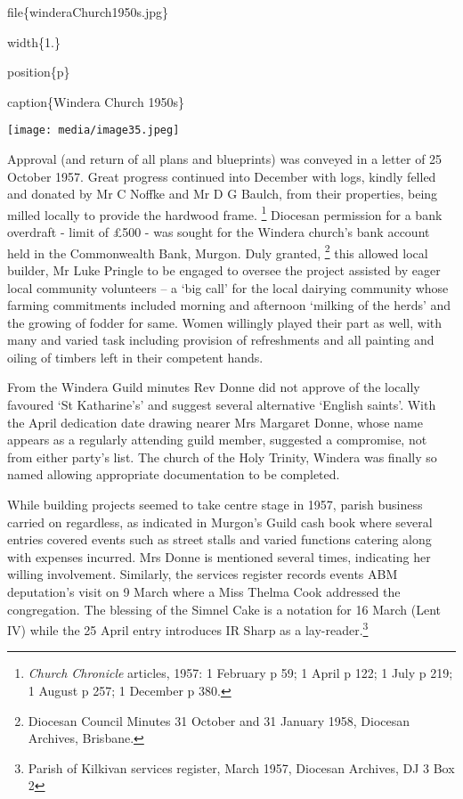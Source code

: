 file\{winderaChurch1950s.jpg\}

width\{1.\}

position\{p\}

caption\{Windera Church 1950s\}

\texttt{[image: media/image35.jpeg]}

Approval (and return of all plans and blueprints) was conveyed in a letter of 25 October 1957. Great progress continued into December with logs, kindly felled and donated by Mr C Noffke and Mr D G Baulch, from their properties, being milled locally to provide the hardwood frame. \footnote{\emph{Church Chronicle} articles, 1957: 1 February p 59; 1 April p 122; 1 July p 219; 1 August p 257; 1 December p 380.} Diocesan permission for a bank overdraft - limit of £500 - was sought for the Windera church's bank account held in the Commonwealth Bank, Murgon. Duly granted, \footnote{Diocesan Council Minutes 31 October and 31 January 1958, Diocesan Archives, Brisbane.} this allowed local builder, Mr Luke Pringle to be engaged to oversee the project assisted by eager local community volunteers -- a `big call' for the local dairying community whose farming commitments included morning and afternoon `milking of the herds' and the growing of fodder for same. Women willingly played their part as well, with many and varied task including provision of refreshments and all painting and oiling of timbers left in their competent hands.

From the Windera Guild minutes Rev Donne did not approve of the locally favoured `St Katharine's' and suggest several alternative `English saints'. With the April dedication date drawing nearer Mrs Margaret Donne, whose name appears as a regularly attending guild member, suggested a compromise, not from either party's list. The church of the Holy Trinity, Windera was finally so named allowing appropriate documentation to be completed.

While building projects seemed to take centre stage in 1957, parish business carried on regardless, as indicated in Murgon's Guild cash book where several entries covered events such as street stalls and varied functions catering along with expenses incurred. Mrs Donne is mentioned several times, indicating her willing involvement. Similarly, the services register records events ABM deputation's visit on 9 March where a Miss Thelma Cook addressed the congregation. The blessing of the Simnel Cake is a notation for 16 March (Lent IV) while the 25 April entry introduces IR Sharp as a lay-reader.\footnote{Parish of Kilkivan services register, March 1957, Diocesan Archives, DJ 3 Box 2}

